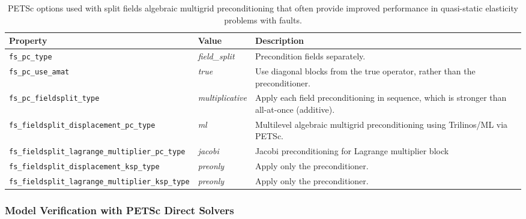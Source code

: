 \noindent \begin{center}
\begin{table}[H]
\centering{}\caption{\label{tab:petsc:options:advanced}PETSc options used with split fields
algebraic multigrid preconditioning that often provide improved performance
in quasi-static elasticity problems with faults.}
\begin{tabular}{|>{\raggedright}p{2.75in}|>{\centering}m{0.75in}|>{\raggedright}p{2.5in}|}
\hline 
\textbf{Property} & \textbf{Value} & \textbf{Description}\tabularnewline
\hline 
\hline 
\texttt{\footnotesize{}fs\_pc\_type} & \textit{field\_split} & Precondition fields separately.\tabularnewline
\hline 
\texttt{\footnotesize{}fs\_pc\_use\_amat} & \textit{true} & Use diagonal blocks from the true operator, rather than the preconditioner.\tabularnewline
\hline 
\texttt{\footnotesize{}fs\_pc\_fieldsplit\_type} & \textit{multiplicative} & Apply each field preconditioning in sequence, which is stronger than
all-at-once (additive).\tabularnewline
\hline 
\texttt{\footnotesize{}fs\_fieldsplit\_displacement\_pc\_type} & \textit{ml} & Multilevel algebraic multigrid preconditioning using Trilinos/ML via
PETSc.\tabularnewline
\hline 
\texttt{\footnotesize{}fs\_fieldsplit\_lagrange\_multiplier\_pc\_type} & \textit{jacobi} & Jacobi preconditioning for Lagrange multiplier block\tabularnewline
\hline 
\texttt{\footnotesize{}fs\_fieldsplit\_displacement\_ksp\_type} & \textit{preonly} & Apply only the preconditioner.\tabularnewline
\hline 
\texttt{\footnotesize{}fs\_fieldsplit\_lagrange\_multiplier\_ksp\_type} & \textit{preonly} & Apply only the preconditioner.\tabularnewline
\hline 
\end{tabular}
\end{table}

\par\end{center}


\subsubsection{Model Verification with PETSc Direct Solvers}

